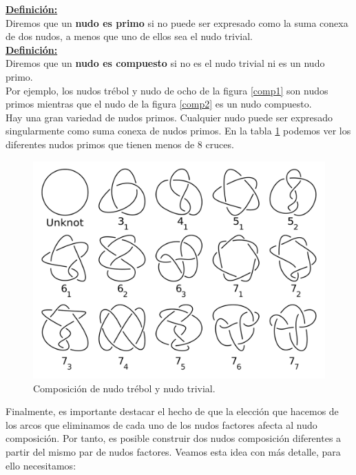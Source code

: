 \underline{\textbf{ Definición:}}\\
Diremos que un \textbf{nudo es primo} si no puede ser expresado como la suma conexa de dos nudos, a menos que uno de ellos sea el nudo trivial. \\

\underline{ \textbf{ Definición:}}\\
Diremos que un \textbf{nudo es compuesto} si no es el nudo trivial ni es un nudo primo.\\

Por ejemplo, los nudos trébol y nudo de ocho de la figura \ref{comp1} son nudos primos mientras que el nudo de la figura \ref{comp2} es un nudo compuesto. \\ 

Hay una gran variedad de nudos primos. Cualquier nudo puede ser expresado singularmente como suma conexa de nudos primos. En la tabla \ref{comp6} podemos ver los diferentes nudos primos que tienen menos de 8 cruces.\\
\begin{figure}[h!]
	\includegraphics[width=14cm]{inudos/tableknot.png}
	\centering
	\caption{Composición de nudo trébol y nudo trivial.}
	\label{comp6} 
\end{figure}




Finalmente, es importante destacar el hecho de que la elección que hacemos de los arcos que eliminamos de cada uno de los nudos factores afecta al nudo composición. Por tanto, es posible construir dos nudos composición diferentes a partir del mismo par de nudos factores. Veamos esta idea con más detalle, para ello necesitamos:\\

